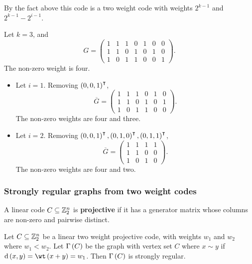 By the fact above this code is a two weight code with weights $ 2^{k - 1} $ and $ 2^{k - 1} - 2^{i - 1} $.

\begin{example*}
Let $ k = 3 $, and
$$ G =
\begin{pmatrix}
1 & 1 & 1 & 0 & 1 & 0 & 0 \\
1 & 1 & 0 & 1 & 0 & 1 & 0 \\
1 & 0 & 1 & 1 & 0 & 0 & 1
\end{pmatrix}.
$$
The non-zero weight is four.
\begin{itemize}
\item Let $ i = 1 $. Removing $ \br{0, 0, 1}^\intercal $,
$$ \overline{G} =
\begin{pmatrix}
1 & 1 & 1 & 0 & 1 & 0 \\
1 & 1 & 0 & 1 & 0 & 1 \\
1 & 0 & 1 & 1 & 0 & 0
\end{pmatrix}.
$$
The non-zero weights are four and three.
\item Let $ i = 2 $. Removing $ \br{0, 0, 1}^\intercal, \br{0, 1, 0}^\intercal, \br{0, 1, 1}^\intercal $,
$$ \overline{G} =
\begin{pmatrix}
1 & 1 & 1 & 1 \\
1 & 1 & 0 & 0 \\
1 & 0 & 1 & 0
\end{pmatrix}.
$$
The non-zero weights are four and two.
\end{itemize}
\end{example*}

\subsubsection{Strongly regular graphs from two weight codes}

\begin{definition*}
A linear code $ C \subseteq \mathbb{Z}_2^n $ is \textbf{projective} if it has a generator matrix whose columns are non-zero and pairwise distinct.
\end{definition*}

\begin{theorem}[Delsarte]
\label{thm:2.11}
Let $ C \subseteq \mathbb{Z}_2^n $ be a linear two weight projective code, with weights $ w_1 $ and $ w_2 $ where $ w_1 < w_2 $. Let $ \Gamma\br{C} $ be the graph with vertex set $ C $ where $ x \sim y $ if $ \d\br{x, y} = \wt \br{x + y} = w_1 $. Then $ \Gamma\br{C} $ is strongly regular.
\end{theorem}

